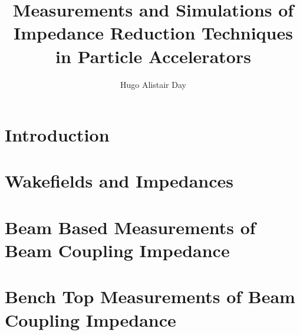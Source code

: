 \documentclass[12pt,PhD]{Thesis}
\begin{document}
%
\title{Measurements and Simulations of Impedance Reduction Techniques in Particle Accelerators}
\author{Hugo Alistair Day}


\beforeabstract
{}

\afterabstract




%
\afterpreface


%
%
%


\chapter{Introduction}




\chapter{Wakefields and Impedances}








\chapter{Beam Based Measurements of Beam Coupling Impedance}



\chapter{Bench Top Measurements of Beam Coupling Impedance}



\end{document}
